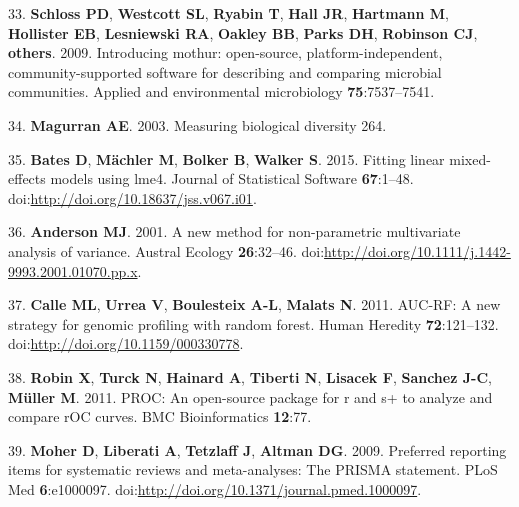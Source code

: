 \documentclass[12pt,]{article}
\begin{document}
33. \textbf{Schloss PD}, \textbf{Westcott SL}, \textbf{Ryabin T},
\textbf{Hall JR}, \textbf{Hartmann M}, \textbf{Hollister EB},
\textbf{Lesniewski RA}, \textbf{Oakley BB}, \textbf{Parks DH},
\textbf{Robinson CJ}, \textbf{others}. 2009. Introducing mothur:
open-source, platform-independent, community-supported software for
describing and comparing microbial communities. Applied and
environmental microbiology \textbf{75}:7537--7541.

34. \textbf{Magurran AE}. 2003. Measuring biological diversity 264.

35. \textbf{Bates D}, \textbf{Mächler M}, \textbf{Bolker B},
\textbf{Walker S}. 2015. Fitting linear mixed-effects models using lme4.
Journal of Statistical Software \textbf{67}:1--48.
doi:\url{http://doi.org/10.18637/jss.v067.i01}.

36. \textbf{Anderson MJ}. 2001. A new method for non-parametric
multivariate analysis of variance. Austral Ecology \textbf{26}:32--46.
doi:\url{http://doi.org/10.1111/j.1442-9993.2001.01070.pp.x}.

37. \textbf{Calle ML}, \textbf{Urrea V}, \textbf{Boulesteix A-L},
\textbf{Malats N}. 2011. AUC-RF: A new strategy for genomic profiling
with random forest. Human Heredity \textbf{72}:121--132.
doi:\url{http://doi.org/10.1159/000330778}.

38. \textbf{Robin X}, \textbf{Turck N}, \textbf{Hainard A},
\textbf{Tiberti N}, \textbf{Lisacek F}, \textbf{Sanchez J-C},
\textbf{Müller M}. 2011. PROC: An open-source package for r and s+ to
analyze and compare rOC curves. BMC Bioinformatics \textbf{12}:77.

39. \textbf{Moher D}, \textbf{Liberati A}, \textbf{Tetzlaff J},
\textbf{Altman DG}. 2009. Preferred reporting items for systematic
reviews and meta-analyses: The PRISMA statement. PLoS Med
\textbf{6}:e1000097.
doi:\url{http://doi.org/10.1371/journal.pmed.1000097}.
\end{document}
